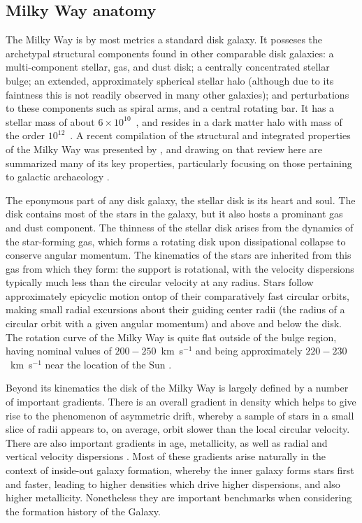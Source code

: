 \subsection{Milky Way anatomy}

The Milky Way is by most metrics a standard disk galaxy. It posseses the archetypal structural components found in other comparable disk galaxies: a multi-component stellar, gas, and dust disk; a centrally concentrated stellar bulge; an extended, approximately spherical stellar halo (although due to its faintness this is not readily observed in many other galaxies); and perturbations to these components such as spiral arms, and a central rotating bar. It has a stellar mass of about $6\times10^{10}$~\Msun, and resides in a dark matter halo with mass of the order $10^{12}$~\Msun.  A recent compilation of the structural and integrated properties of the Milky Way was presented by \textcite{bland-hawthorn16}, and drawing on that review here are summarized many of its key properties, particularly focusing on those pertaining to galactic archaeology \parencite[see also][]{ivezic12}.

The eponymous part of any disk galaxy, the stellar disk is its heart and soul. The disk contains most of the stars in the galaxy, but it also hosts a prominant gas and dust component. The thinness of the stellar disk arises from the dynamics of the star-forming gas, which forms a rotating disk upon dissipational collapse to conserve angular momentum. The kinematics of the stars are inherited from this gas from which they form: the support is rotational, with the velocity dispersions typically much less than the circular velocity at any radius. Stars follow approximately epicyclic motion ontop of their comparatively fast circular orbits, making small radial excursions about their guiding center radii (the radius of a circular orbit with a given angular momentum) and above and below the disk. The rotation curve of the Milky Way is quite flat outside of the bulge region, having nominal values of $200-250$~km~s$^{-1}$ and being approximately $220-230$~km~s$^{-1}$ near the location of the Sun \parencite[e.g.][]{bovy12a,eilers19}.

Beyond its kinematics the disk of the Milky Way is largely defined by a number of important gradients. There is an overall gradient in density \parencite[equivalently luminosity, as in other galaxies per e.g.][]{freeman70} which helps to give rise to the phenomenon of asymmetric drift, whereby a sample of stars in a small slice of radii appears to, on average, orbit slower than the local circular velocity. There are also important gradients in age, metallicity, as well as radial and vertical velocity dispersions \parencite[e.g.][]{bovy12d,bovy16b,mackereth19a}. Most of these gradients arise naturally in the context of inside-out galaxy formation, whereby the inner galaxy forms stars first and faster, leading to higher densities which drive higher dispersions, and also higher metallicity. Nonetheless they are important benchmarks when considering the formation history of the Galaxy.

